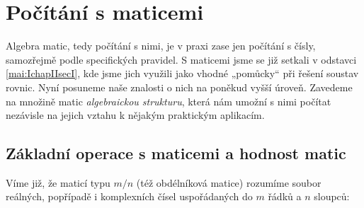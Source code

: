   \section{Počítání s maticemi}\label{mai:IchapIIsecIII}
    Algebra matic, tedy počítání s nimi, je v praxi zase jen počítání s čísly, samozřejmě podle
    specifických pravidel. S maticemi jsme se již setkali v odstavci \ref{mai:IchapIIsecI}, kde 
    jsme jich využili jako vhodné „pomůcky“ při řešení soustav rovnic. Nyní posuneme naše 
    znalosti o nich na poněkud vyšší úroveň. Zavedeme na množině matic \emph{algebraickou 
    strukturu}, která nám umožní s nimi počítat nezávisle na jejich vztahu k nějakým praktickým 
    aplikacím.
    \subsection{Základní operace s maticemi a hodnost matic}\label{mai:IchapIIsecIIIsubI}
      Víme již, že maticí typu \(m/n\) (též obdélníková matice) rozumíme soubor reálných,       
      popřípadě i komplexních čísel uspořádaných do \(m\) řádků a \(n\) sloupců:

